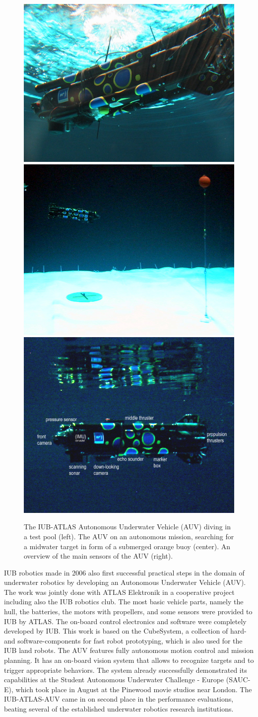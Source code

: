 \begin{figure}
\centering
\includegraphics[width=.32\linewidth]{AUV-2006-best01.png}
\includegraphics[width=.32\linewidth]{AUV-2006-best03.png}
\includegraphics[width=.32\linewidth]{AUV-2006-best02-text.png}
\caption{The IUB-ATLAS Autonomous Underwater Vehicle (AUV) diving in a test pool
  (left). The AUV on an autonomous mission, searching for a midwater target in form of a
  submerged orange buoy (center). An overview of the main sensors of the AUV (right).}
\label{IUB-AUV}
\end{figure}

IUB robotics made in 2006 also first successful practical steps in the domain of
underwater robotics by developing an Autonomous Underwater Vehicle (AUV). The work was
jointly done with ATLAS Elektronik in a cooperative project including also the IUB
robotics club. The most basic vehicle parts, namely the hull, the batteries, the motors
with propellers, and some sensors were provided to IUB by ATLAS. The on-board control
electronics and software were completely developed by IUB. This work is based on the
CubeSystem, a collection of hard- and software-components for fast robot prototyping,
which is also used for the IUB land robots. The AUV features fully autonomous motion
control and mission planning. It has an on-board vision system that allows to recognize
targets and to trigger appropriate behaviors. The system already successfully demonstrated
its capabilities at the Student Autonomous Underwater Challenge - Europe (SAUC-E), which
took place in August at the Pinewood movie studios near London.  The IUB-ATLAS-AUV came in
on second place in the performance evaluations, beating several of the established
underwater robotics research institutions.

